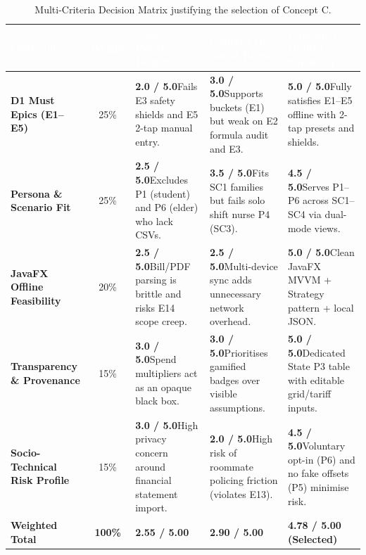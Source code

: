 \documentclass[12pt, a4paper]{article}
\begin{document}
\begin{table}[H]
\centering
\small
\renewcommand{\arraystretch}{1.45}
\begin{tabularx}{\textwidth}{@{} >{\bfseries}p{3.0cm} c X X X @{}}
\toprule
\rowcolor{AcademicNavy}
\textcolor{white}{Criterion} & \textcolor{white}{Weight} & \textcolor{white}{Concept A: Passive Ledger} & \textcolor{white}{Concept B: Social Kiosk} & \textcolor{white}{Concept C: Hybrid Simulator} \\
\midrule
D1 Must Epics (E1--E5) & 25\% & \textbf{2.0 / 5.0}\newline Fails E3 safety shields and E5 2-tap manual entry. & \textbf{3.0 / 5.0}\newline Supports buckets (E1) but weak on E2 formula audit and E3. & \textbf{5.0 / 5.0}\newline Fully satisfies E1--E5 offline with 2-tap presets and shields. \\
\rowcolor{RowAlt}
Persona \& Scenario Fit & 25\% & \textbf{2.5 / 5.0}\newline Excludes P1 (student) and P6 (elder) who lack CSVs. & \textbf{3.5 / 5.0}\newline Fits SC1 families but fails solo shift nurse P4 (SC3). & \textbf{4.5 / 5.0}\newline Serves P1--P6 across SC1--SC4 via dual-mode views. \\
JavaFX Offline Feasibility & 20\% & \textbf{2.5 / 5.0}\newline Bill/PDF parsing is brittle and risks E14 scope creep. & \textbf{2.5 / 5.0}\newline Multi-device sync adds unnecessary network overhead. & \textbf{5.0 / 5.0}\newline Clean JavaFX MVVM + Strategy pattern + local JSON. \\
\rowcolor{RowAlt}
Transparency \& Provenance & 15\% & \textbf{3.0 / 5.0}\newline Spend multipliers act as an opaque black box. & \textbf{3.0 / 5.0}\newline Prioritises gamified badges over visible assumptions. & \textbf{5.0 / 5.0}\newline Dedicated State P3 table with editable grid/tariff inputs. \\
Socio-Technical Risk Profile & 15\% & \textbf{3.0 / 5.0}\newline High privacy concern around financial statement import. & \textbf{2.0 / 5.0}\newline High risk of roommate policing friction (violates E13). & \textbf{4.5 / 5.0}\newline Voluntary opt-in (P6) and no fake offsets (P5) minimise risk. \\
\midrule
\textbf{Weighted Total} & \textbf{100\%} & \textbf{2.55 / 5.00} & \textbf{2.90 / 5.00} & \textbf{4.78 / 5.00 (Selected)} \\
\bottomrule
\end{tabularx}
\caption{Multi-Criteria Decision Matrix justifying the selection of Concept C.}
\label{tab:mcdm}
\end{table}
\end{document}
